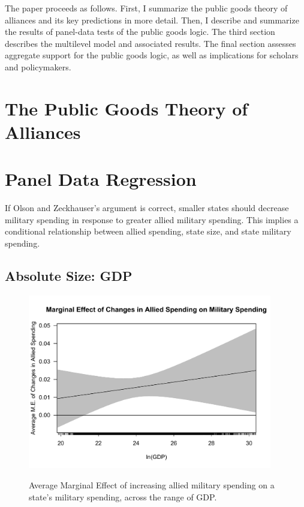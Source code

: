 \documentclass[12pt]{article}
\begin{document}
The paper proceeds as follows.
First, I summarize the public goods theory of alliances and its key predictions in more detail.
Then, I describe and summarize the results of panel-data tests of the public goods logic.
The third section describes the multilevel model and associated results. 
The final section assesses aggregate support for the public goods logic, as well as implications for scholars and policymakers. 


\section{The Public Goods Theory of Alliances}


\section{Panel Data Regression}

If Olson and Zeckhauser's argument is correct, smaller states should decrease military spending in response to greater allied military spending. 
This implies a conditional relationship between allied spending, state size, and state military spending. 


\subsection{Absolute Size: GDP}

\begin{figure}
	\centering
		\includegraphics[width=0.95\textwidth]{abs-margins-plot.pdf}
	\label{fig:abs-margins-plot}
	\caption{Average Marginal Effect of increasing allied military spending on a state's military spending, across the range of GDP.}
\end{figure}
\end{document}
